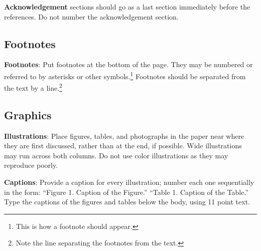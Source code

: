 \documentclass[11pt]{article}
\begin{document}
\textbf{Acknowledgement} sections should go as a last section immediately
before the references.  Do not number the acknowledgement section.

\subsection{Footnotes}

{\bf Footnotes}: Put footnotes at the bottom of the page. They may
be numbered or referred to by asterisks or other
symbols.\footnote{This is how a footnote should appear.} Footnotes
should be separated from the text by a line.\footnote{Note the
line separating the footnotes from the text.}

\subsection{Graphics}

{\bf Illustrations}: Place figures, tables, and photographs in the
paper near where they are first discussed, rather than at the end, if
possible.  Wide illustrations may run across both columns. Do not use
color illustrations as they may reproduce poorly.

{\bf Captions}: Provide a caption for every illustration; number each one
sequentially in the form:  ``Figure 1. Caption of the Figure.'' ``Table 1.
Caption of the Table.''  Type the captions of the figures and 
tables below the body, using 11 point text.  




\end{document}

